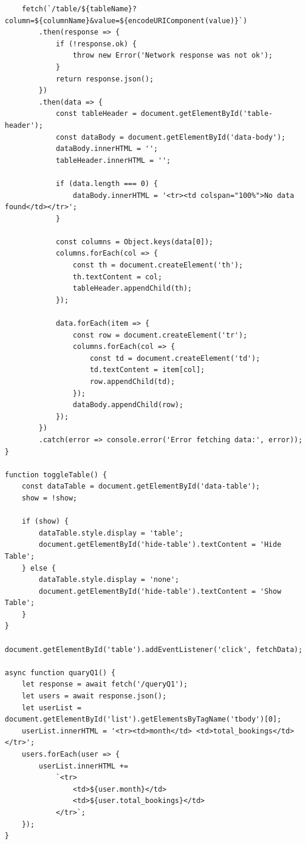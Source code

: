 \documentclass{report}
\begin{document}
\begin{verbatim}
    fetch(`/table/${tableName}?column=${columnName}&value=${encodeURIComponent(value)}`)
        .then(response => {
            if (!response.ok) {
                throw new Error('Network response was not ok');
            }
            return response.json();
        })
        .then(data => {
            const tableHeader = document.getElementById('table-header');
            const dataBody = document.getElementById('data-body');
            dataBody.innerHTML = '';
            tableHeader.innerHTML = '';

            if (data.length === 0) {
                dataBody.innerHTML = '<tr><td colspan="100%">No data found</td></tr>';
            }

            const columns = Object.keys(data[0]);
            columns.forEach(col => {
                const th = document.createElement('th');
                th.textContent = col; 
                tableHeader.appendChild(th);
            });

            data.forEach(item => {
                const row = document.createElement('tr');
                columns.forEach(col => {
                    const td = document.createElement('td');
                    td.textContent = item[col];
                    row.appendChild(td);
                });
                dataBody.appendChild(row);
            });
        })
        .catch(error => console.error('Error fetching data:', error));
}

function toggleTable() {
    const dataTable = document.getElementById('data-table');
    show = !show;

    if (show) {
        dataTable.style.display = 'table'; 
        document.getElementById('hide-table').textContent = 'Hide Table';
    } else {
        dataTable.style.display = 'none';
        document.getElementById('hide-table').textContent = 'Show Table'; 
    }
}

document.getElementById('table').addEventListener('click', fetchData);

async function quaryQ1() {
    let response = await fetch('/queryQ1');
    let users = await response.json();
    let userList = document.getElementById('list').getElementsByTagName('tbody')[0];
    userList.innerHTML = '<tr><td>month</td> <td>total_bookings</td> </tr>'; 
    users.forEach(user => {
        userList.innerHTML +=                 
            `<tr> 
                <td>${user.month}</td> 
                <td>${user.total_bookings}</td> 
            </tr>`;
    });
}


\end{verbatim}
\end{document}
